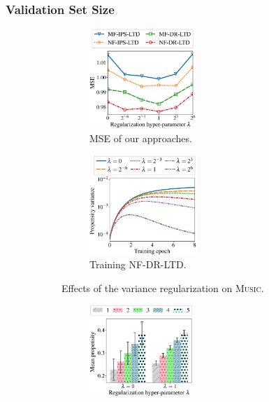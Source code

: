 \documentclass[letterpaper]{article} %
\begin{document}
\subsubsection{Validation Set Size}
\begin{figure}[!t]
\hspace*{-0.44cm}
\begin{minipage}[t]{1.090\linewidth}
\centering
\begin{figure}[H]
\centering
\begin{subfigure}{0.495\textwidth}
  \centering
  \includegraphics[height=3.76cm]{fig/mse_var_reg.eps}
  \caption{MSE of our approaches.}
  \label{fig:mse var reg}
\end{subfigure}
\hfill %
\begin{subfigure}{0.495\textwidth}
  \centering
  \includegraphics[height=3.76cm]{fig/variance_epoch.eps}
  \caption{Training NF-DR-LTD.}
  \label{fig:variance epoch}
\end{subfigure}
\caption{Effects of the variance regularization on \textsc{Music}.}
\end{figure}%
\end{minipage}
\hspace*{-0.44cm}
\begin{minipage}[t]{1.090\linewidth}
\centering
\begin{figure}[H]
\centering
\begin{subfigure}{0.495\textwidth}
  \centering
  \includegraphics[height=3.46cm]{fig/propensity_rating.eps}

\end{subfigure}
\end{figure}
\end{minipage}
\end{figure}
\end{document}
